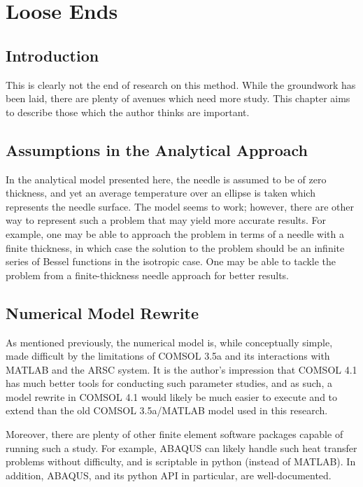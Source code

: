 \chapter{Loose Ends}

\section{Introduction}

This is clearly not the end of research on this method. While the groundwork has
been laid, there are plenty of avenues which need more study. This chapter aims
to describe those which the author thinks are important.

\section{Assumptions in the Analytical Approach}

In the analytical model presented here, the needle is assumed to be of zero
thickness, and yet an average temperature over an ellipse is taken which
represents the needle surface.  The model seems to work; however, there are
other way to represent such a problem that may yield more accurate results. For
example, one may be able to approach the problem in terms of a needle with a
finite thickness, in which case the solution to the problem should be an
infinite series of Bessel functions in the isotropic case. One may be able to
tackle the problem from a finite-thickness needle approach for better results.

\section{Numerical Model Rewrite}

As mentioned previously, the numerical model is, while conceptually simple, made
difficult by the limitations of COMSOL 3.5a and its interactions with MATLAB and
the ARSC system.  It is the author's impression that COMSOL 4.1 has much better
tools for conducting such parameter studies, and as such, a model rewrite in
COMSOL 4.1 would likely be much easier to execute and to extend than the old
COMSOL 3.5a/MATLAB model used in this research.

Moreover, there are plenty of other finite element software packages capable of
running such a study. For example, ABAQUS can likely handle such heat transfer
problems without difficulty, and is scriptable in python (instead of MATLAB).
In addition, ABAQUS, and its python API in particular, are well-documented.

